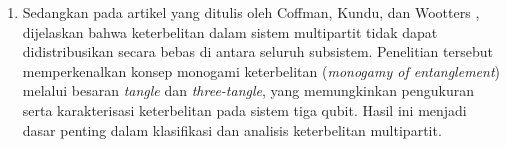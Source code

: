 \begin{enumerate}
	Contoh keadaan Bell:
	\begin{equation}
		\ket{\psi}=\frac{1}{\sqrt{2}}(\ket{01}+\ket{10})
	\end{equation}
	\begin{equation}
		\begin{aligned}
			\rho
			&=\ket{\psi}\bra{\psi}\\
			&=\frac{1}{2}(\ket{01})\bra{01}+\ket{01})\bra{10}+\ket{10})\bra{01}+\ket{10})\bra{10}
		\end{aligned}
	\end{equation}
	\begin{equation}
		\begin{aligned}
			\rho_A
			&=I\otimes\bra{0}\rho I\otimes\ket{0} +I\otimes\bra{1}\rho_1I\otimes\ket{1}\\
			&=\frac{1}{2}(\ket{1}\bra{1}+\ket{0}\bra{0})\\
			&=
			\begin{pmatrix}
				\frac{1}{2}&0\\
				0&\frac{1}{2}
			\end{pmatrix}\\
			&=\rho_{B}
		\end{aligned}
	\end{equation}
	\begin{equation}
		\begin{aligned}
			|\rho_{A}-I\lambda|
			&=
			\begin{bmatrix}
				\frac{1}{2}-\lambda&0\\
				0&\frac{1}{2}-\lambda
			\end{bmatrix}\\
			&=(\frac{1}{2}-\lambda)^2\\
			&=0
		\end{aligned}
	\end{equation}
	
	sehingga diperoleh $\lambda_1=\lambda_2=\frac{1}{2}$
	dan
	\begin{equation}
		\begin{aligned}
			E(\psi)
			&=-\frac{1}{2}\log_2\frac{1}{2}-\frac{1}{2}\log_2\frac{1}{2}\\
			&=\frac{1}{2}\log2+\frac{1}{2}\log2\\
			&=1
		\end{aligned}
	\end{equation}
	
	di mana hasil tersebut maksimal.
	
	\item Sedangkan pada artikel yang ditulis oleh Coffman, Kundu, dan Wootters \cite{coffman2000distributed}, dijelaskan bahwa keterbelitan dalam sistem multipartit tidak dapat didistribusikan secara bebas di antara seluruh subsistem. Penelitian tersebut memperkenalkan konsep monogami keterbelitan (\textit{monogamy of entanglement}) melalui besaran \textit{tangle} dan \textit{three-tangle}, yang memungkinkan pengukuran serta karakterisasi keterbelitan pada sistem tiga qubit. Hasil ini menjadi dasar penting dalam klasifikasi dan analisis keterbelitan multipartit.
	

\end{enumerate}
